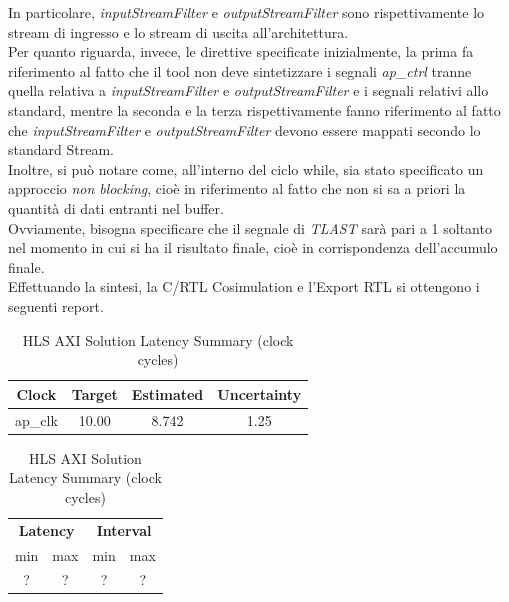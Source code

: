 In particolare, \textit{inputStreamFilter} e \textit{outputStreamFilter} sono rispettivamente lo stream di ingresso e lo stream di uscita all'architettura. 
\\
Per quanto riguarda, invece, le direttive specificate inizialmente, la prima fa riferimento al fatto che il tool non deve sintetizzare i segnali \textit{ap\_ctrl} tranne quella relativa a \textit{inputStreamFilter} e \textit{outputStreamFilter} e i segnali relativi allo standard, mentre la seconda e la terza rispettivamente fanno riferimento al fatto che \textit{inputStreamFilter} e \textit{outputStreamFilter} devono essere mappati secondo lo standard Stream.
\\
Inoltre, si può notare come, all'interno del ciclo while, sia stato specificato un approccio \textit{non blocking}, cioè in riferimento al fatto che non si sa a priori la quantità di dati entranti nel buffer.
\\
Ovviamente, bisogna specificare che il segnale di \textit{TLAST} sarà pari a 1 soltanto nel momento in cui si ha il risultato finale, cioè in corrispondenza dell'accumulo finale.
\\
Effettuando la sintesi, la C/RTL Cosimulation e l'Export RTL si ottengono i seguenti report.

\begin{table}[H]
	\centering
	\begin{minipage}[t]{0.45\linewidth}
		\centering
		\begin{tabular}{|c|c|c|c|}
			\hline
			\textbf{Clock} & \textbf{Target} & \textbf{Estimated} & \textbf{Uncertainty} \\
			\hline
			ap\_clk & 10.00 & 8.742 & 1.25 \\
			\hline
		\end{tabular}
		\caption{HLS AXI Solution Timing Summary (ns)}
		\label{tab:hls-axi-solution-timing-summary}
	\end{minipage}
	\hfill
	\begin{minipage}[t]{0.45\linewidth}
		\centering
		\begin{tabular}{|c|c|c|c|}
			\hline
			\multicolumn{2}{|c|}{\textbf{Latency}} & \multicolumn{2}{|c|}{\textbf{Interval}} \\
			min & max & min & max \\
			\hline
			? & ? & ? & ? \\
			\hline
		\end{tabular}
		\caption{HLS AXI Solution Latency Summary (clock cycles)}
		\label{tab:hls-axi-solution-latency-summary}
	\end{minipage}
\end{table}

